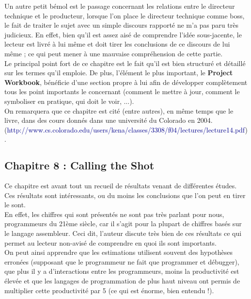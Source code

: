 \documentclass[runningheads]{llncs}
\newcommand{\blu}[1]{\textcolor{darkblue}{#1}}
\begin{document}
Un autre petit bémol est le passage concernant les relations entre le directeur technique et le producteur, lorsque l'on place le 
directeur technique comme boss, le fait de traiter le sujet avec un simple discours rapporté ne m'a pas paru très judicieux. En 
effet, bien qu'il est assez aisé de comprendre l'idée sous-jacente, le lecteur est livré à lui m\^eme et doit tirer les 
conclusions de ce discours de lui m\^eme ; ce qui peut mener à une mauvaise compréhension de cette partie. \\

Le principal point fort de ce chapitre est le fait qu'il est bien structuré et détaillé sur les termes qu'il emploie. De plus,
l'élément le plus important, le \textbf{Project Workbook}, bénéficie d'une section propre à lui afin de développer complètement 
tous les point importants le concernant (comment le mettre à jour, comment le symboliser en pratique, qui doit le voir, ...). \\

On remarquera que ce chapitre est cité (entre autres), en même temps que le livre, dans des cours donnés dans une université du 
Colorado en 2004. \\ (\blu{http://www.cs.colorado.edu/users/kena/classes/3308/f04/lectures/lecture14.pdf}).

\subsection{Chapitre 8 : Calling the Shot}

Ce chapitre est avant tout un recueil de résultats venant de différentes études. Ces résultats sont intéressants, ou du moins
les conclusions que l'on peut en tirer le sont. \\
En effet, les chiffres qui sont présentés ne sont pas très parlant pour nous, programmeurs du 21ème siècle, car il s'agit pour la 
plupart de chiffres basés sur le langage assembleur. Ceci dit, l'auteur discute très bien de ces résultats ce qui permet au 
lecteur non-avisé de comprendre en quoi ils sont importants.\\
On peut ainsi apprendre que les estimations utilisent souvent des hypothèses erronées (supposant que le programmeur ne fait que 
programmer et débugger), que plus il y a d'interactions entre les programmeurs, moins la productivité est élevée et que les 
langages de programmation de plus haut niveau ont permis de multiplier cette productivité par 5 (ce qui est énorme, bien entendu 
!).
\end{document}
